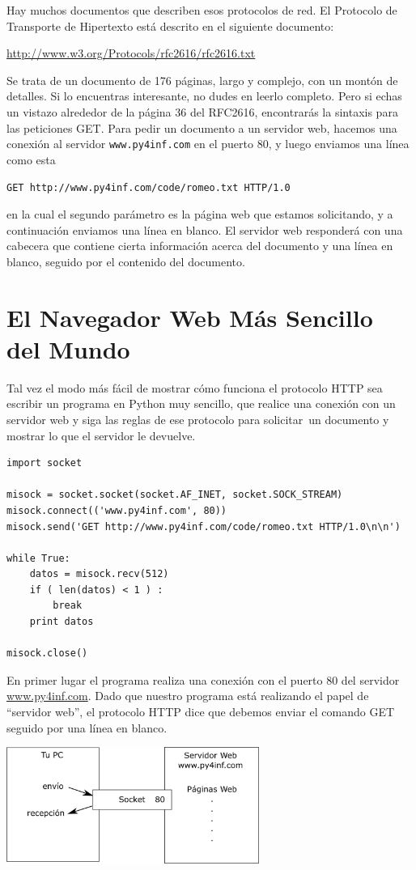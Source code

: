 Hay muchos documentos que describen esos protocolos de red. El Protocolo de Transporte de
Hipertexto está descrito en el siguiente documento:

\url{http://www.w3.org/Protocols/rfc2616/rfc2616.txt}

Se trata de un documento de 176 páginas, largo y complejo, con un montón de detalles. Si lo
encuentras interesante, no dudes en leerlo completo. Pero si echas un vistazo alrededor de la
página 36 del RFC2616, encontrarás la sintaxis para las peticiones GET. Para pedir un documento a un
servidor web, hacemos una conexión al servidor {\tt www.py4inf.com} en el puerto 80, y luego
enviamos una línea como esta

{\tt GET http://www.py4inf.com/code/romeo.txt HTTP/1.0 }

en la cual el segundo parámetro es la página web que estamos solicitando, y a continuación
enviamos una línea en blanco. El servidor web responderá con una cabecera que contiene cierta
información acerca del documento y una línea en blanco,
seguido por el contenido del documento.

\section{El Navegador Web Más Sencillo del Mundo}

Tal vez el modo más fácil de mostrar cómo funciona el protocolo HTTP sea escribir un
programa en Python muy sencillo, que realice una conexión con un servidor web y siga
las reglas de ese protocolo para solicitar\ un documento
y mostrar lo que el servidor le devuelve.

\beforeverb
\begin{verbatim}
import socket

misock = socket.socket(socket.AF_INET, socket.SOCK_STREAM)
misock.connect(('www.py4inf.com', 80))
misock.send('GET http://www.py4inf.com/code/romeo.txt HTTP/1.0\n\n')

while True:
    datos = misock.recv(512)
    if ( len(datos) < 1 ) :
        break
    print datos

misock.close()
\end{verbatim}
\afterverb
%
En primer lugar el programa realiza una conexión con el puerto 80 del
servidor \url{www.py4inf.com}.
Dado que nuestro programa está realizando el papel de ``servidor web'', el
protocolo HTTP dice que debemos enviar el comando GET seguido por una línea en blanco.

\beforefig
\centerline{\includegraphics[height=1.50in]{figs2/socket.eps}}
\afterfig

